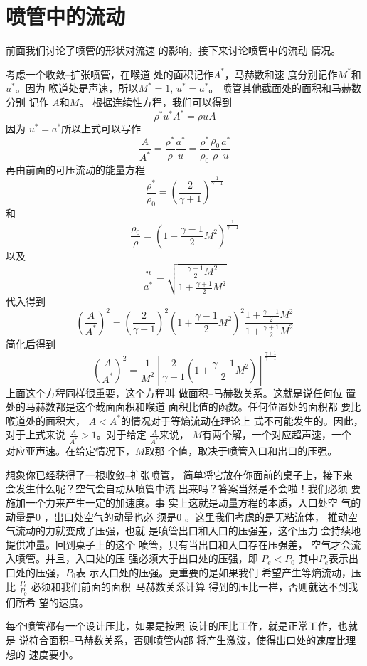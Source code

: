 \section{喷管中的流动}
前面我们讨论了喷管的形状对流速
的影响，接下来讨论喷管中的流动
情况。

考虑一个收敛--扩张喷管，在喉道
处的面积记作$A^*$，马赫数和速
度分别记作$M^*$和$u^*$。因为
喉道处是声速，所以$M^*=1$,
$u^*=a^*$。
喷管其他截面处的面积和马赫数分别
记作
$A$和$M$。
根据连续性方程，我们可以得到
\[
\rho^* u^* A^*=\rho u A   
\]
因为
$u^*=a^*$所以上式可以写作
\[
\frac{A}{A^*}=
\frac{\rho^*}{\rho}
\frac{a^*}{u}
=\frac{\rho^*}{\rho_0}
\frac{\rho_0}{\rho} 
\frac{a^*}{u}
\]
再由前面的可压流动的能量方程
\[
\frac{\rho^*}{\rho_0}=
\left(\frac{2}{\gamma+1}\right)
^{\frac{1}{\gamma-1}}
\]
和
\[
\frac{\rho_0}{\rho}=
\left(1+\frac{\gamma-1}{2}M^{2}\right)^{\frac{1}{\gamma-1}}
\]
以及
\[
\frac{u}{a^*}=
\sqrt{
  \frac{\frac{\gamma-1}{2}M^{2}}{1+\frac{\gamma+1}{2}M^{2}}
}
\]
代入得到
\[
\left(\frac{A}{A^*}\right)^2=
\left(\frac{2}{\gamma+1}\right)^{2}
\left(1+\frac{\gamma-1}{2}M^{2}\right)^{2}
\frac{1+\frac{\gamma-1}{2}M^{2}}{1+\frac{\gamma+1}{2}M^{2}}
\]
简化后得到
\[
\left(\frac{A}{A^*}\right)^{2}=
\frac{1}{M^{2}}
\left[\frac{2}{\gamma+1}
\left(1+\frac{\gamma-1}{2}
M^{2}\right)\right]^{
  \frac{\gamma+1}{\gamma-1}
}
\]
上面这个方程同样很重要，这个方程叫
做面积--马赫数关系。这就是说任何位
置处的马赫数都是这个截面面积和喉道
面积比值的函数。任何位置处的面积都
要比喉道处的面积大，
$A<A^*$的情况对于等熵流动在理论上
式不可能发生的。因此，对于上式来说
$\frac{A}{A^*}>1$。对于给定
$\frac{A}{A^*}$来说，
$M$有两个解，一个对应超声速，一个 
对应亚声速。在给定情况下，$M$取那
个值，取决于喷管入口和出口的压强。

想象你已经获得了一根收敛--扩张喷管，
简单将它放在你面前的桌子上，接下来 
会发生什么呢？空气会自动从喷管中流
出来吗？答案当然是不会啦！我们必须
要施加一个力来产生一定的加速度。事
实上这就是动量方程的本质，入口处空
气的动量是0 ，出口处空气的动量也必
须是0 。这里我们考虑的是无粘流体，
推动空气流动的力就变成了压强，也就
是喷管出口和入口的压强差，这个压力
会持续地提供冲量。回到桌子上的这个
喷管，只有当出口和入口存在压强差，
空气才会流入喷管。并且，入口处的压
强必须大于出口处的压强，即
$P_e<P_0$
其中$P_e$表示出口处的压强，$P_0$表
示入口处的压强。更重要的是如果我们
希望产生等熵流动，压比
$\frac{P_e}{P_0}$
必须和我们前面的面积--马赫数关系计算
得到的压比一样，否则就达不到我们所希
望的速度。
\begin{notice}
每个喷管都有一个设计压比，如果是按照
设计的压比工作，就是正常工作，也就是
说符合面积--马赫数关系，否则喷管内部
将产生激波，使得出口处的速度比理想的
速度要小。
\end{notice}

